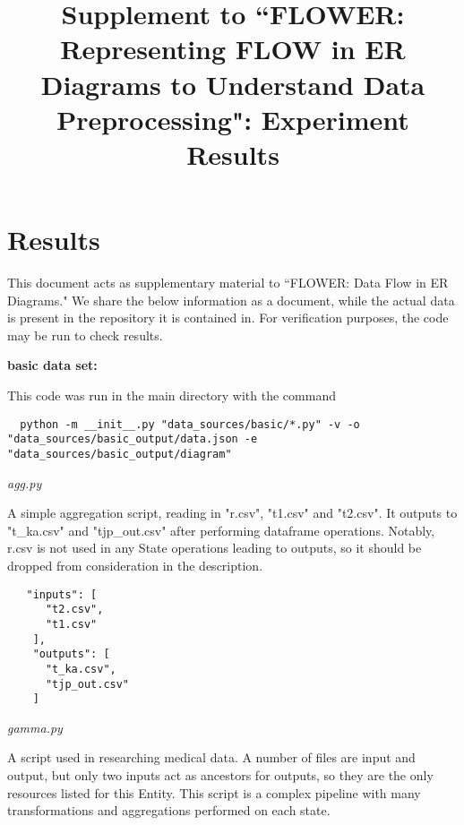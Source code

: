 \documentclass{llncs}
\newcommand{\+}{\discretionary{\mbox{${\bm\cdot}\mkern-1mu$}}{}{}}
\begin{document}
\title{Supplement to ``FLOWER: Representing FLOW in ER Diagrams to Understand Data Preprocessing": Experiment Results}
\author{}
\institute{}
\maketitle


\section{Results}
This document acts as supplementary material to ``FLOWER: Data Flow in ER
Diagrams." We share the below information as a document, while the actual data is present in the repository it is contained in. For verification purposes, the code may be run to check results.


  \textbf{basic data set:}

  This code was run in the main directory with the command 
  
  \begin{lstlisting}
  python -m __init__.py "data_sources/basic/*.py" -v -o "data_sources/basic_output/data.json -e "data_sources/basic_output/diagram"
\end{lstlisting}

\begin{description}
   \item \textit{agg.py}
   \item[Description:] A simple aggregation script, reading in "r.csv", "t1.csv" and "t2.csv". It outputs to "t\_ka.csv" and "tjp\_out.csv" after performing dataframe operations. Notably, r.csv is not used in any State operations leading to outputs, so it should be dropped from consideration in the description.
   \item[Results:] 
\end{description}
\begin{lstlisting}
   "inputs": [
      "t2.csv",
      "t1.csv"
    ],
    "outputs": [
      "t_ka.csv",
      "tjp_out.csv"
    ]
\end{lstlisting}

\begin{description}
   \item \textit{gamma.py}
   \item[Description:] A script used in researching medical data. A number of files are input and output, but only two inputs act as ancestors for outputs, so they are the only resources listed for this Entity. This script is a complex pipeline with many transformations and aggregations performed on each state.
    \item[Results:]
\end{description}
\end{document}
